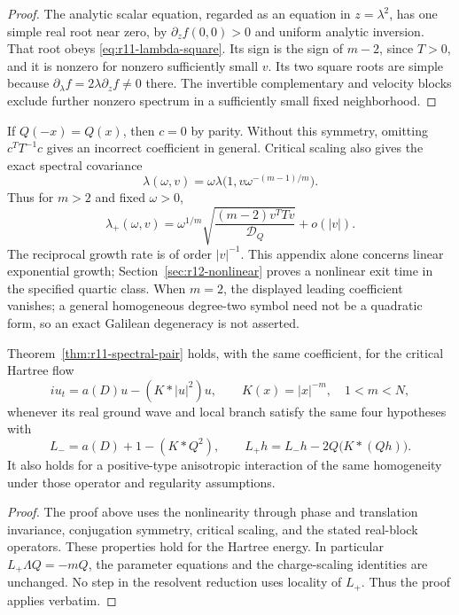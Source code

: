\begin{proof}
The analytic scalar equation, regarded as an equation in $z=\lambda^2$,
has one simple real root near zero, by
$\partial_zf(0,0)>0$ and uniform analytic inversion. That root obeys
\eqref{eq:r11-lambda-square}. Its sign is the sign of $m-2$, since
$T>0$, and it is nonzero for nonzero sufficiently small $v$.
Its two square roots are simple because
$\partial_\lambda f=2\lambda\partial_zf\ne0$ there.
The invertible complementary and velocity blocks exclude further
nonzero spectrum in a sufficiently small fixed neighborhood.
\end{proof}

\begin{remark}
If $Q(-x)=Q(x)$, then $c=0$ by parity. Without this symmetry, omitting
$c^TT^{-1}c$ gives an incorrect coefficient in general.
Critical scaling also gives the exact spectral covariance
\[
 \lambda(\omega,v)=
 \omega\lambda\bigl(1,v\omega^{-(m-1)/m}\bigr).
\]
Thus for $m>2$ and fixed $\omega>0$,
\[
 \lambda_+(\omega,v)=\omega^{1/m}
 \sqrt{\frac{(m-2)v^TTv}{\mathcal D_Q}}+o(|v|).
\]
The reciprocal growth rate is of order $|v|^{-1}$. This appendix alone concerns linear exponential growth; Section~\ref{sec:r12-nonlinear} proves a nonlinear exit time in the specified quartic class. When $m=2$, the displayed leading coefficient vanishes; a general
homogeneous degree-two symbol need not be a quadratic form, so an exact
Galilean degeneracy is not asserted.
\end{remark}

\begin{corollary}
Theorem~\ref{thm:r11-spectral-pair} holds, with the same coefficient,
for the critical Hartree flow
\[
 iu_t=a(D)u-(K*|u|^2)u,
 \qquad K(x)=|x|^{-m},\quad 1<m<N,
\]
whenever its real ground wave and local branch satisfy the same four
hypotheses with
\[
 L_-=a(D)+1-(K*Q^2),\qquad
 L_+h=L_-h-2Q\bigl(K*(Qh)\bigr).
\]
It also holds for a positive-type anisotropic interaction of the same
homogeneity under those operator and regularity assumptions.
\end{corollary}
\begin{proof}
The proof above uses the nonlinearity through phase and translation
invariance, conjugation symmetry, critical scaling, and the stated
real-block operators. These properties hold for the Hartree energy.
In particular $L_+\Lambda Q=-mQ$, the parameter equations and the
charge-scaling identities are unchanged. No step in the resolvent
reduction uses locality of $L_+$. Thus the proof applies verbatim.
\end{proof}

